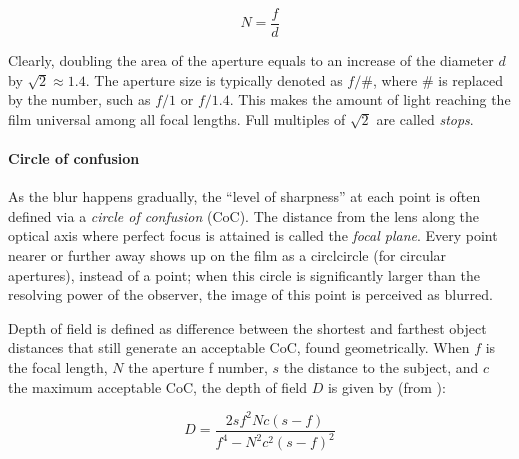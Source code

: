 \begin{equation} \label{eq:fnumber}
	N = \frac{f}{d}
\end{equation}



Clearly, doubling the area of the aperture equals to an increase of the diameter $d$ by $\sqrt 2 \approx 1.4$.
The aperture size is typically denoted as $f/\#$, where $\#$ is replaced by the number, such as $f/1$ or $f/1.4$.
This makes the amount of light reaching the film universal among all focal lengths.
Full multiples of $\sqrt 2$ are called \emph{stops}.
\cite{szeliski10vision}

\paragraph{Circle of confusion}
As the blur happens gradually, the ``level of sharpness'' at each point is often defined via a \emph{circle of confusion} (CoC).
The distance from the lens along the optical axis where perfect focus is attained is called the \emph{focal plane}.
Every point nearer or further away shows up on the film as a circlcircle (for circular apertures), instead of a point; when this circle is significantly larger than the resolving power of the observer, the image of this point is perceived as blurred.
\cite{szeliski10vision,greenleaf1950photographic}

Depth of field is defined as difference between the shortest and farthest object distances that still generate an acceptable CoC, found geometrically.
When $f$ is the focal length, $N$ the aperture f number, $s$ the distance to the subject, and $c$ the maximum acceptable CoC, the depth of field $D$ is given by (from \cite{greenleaf1950photographic}):

\begin{equation} \label{eq:dof}
	D = \frac{2 s f^2 N c (s - f)} {f^4 - N^2 c^2 (s - f)^2}
\end{equation}



